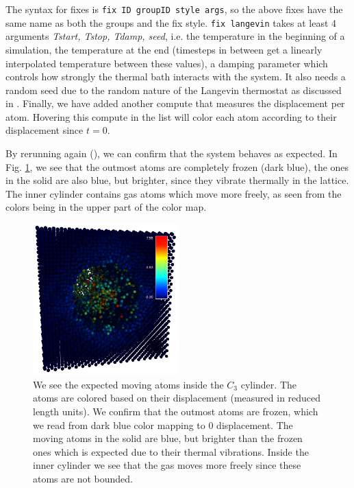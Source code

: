 \documentclass[aps,pre,twocolumn,letterpaper,floatfix,nofootinbib]{revtex4}
\newcommand{\code}[1]{\colorbox{light-gray}{\color{RawSienna}\texttt{#1}}}
\begin{document}
The syntax for fixes is \code{fix ID groupID style args}, so the above fixes have the same name as both the groups and the fix style.
\code{fix langevin} takes at least 4 arguments \textit{Tstart, Tstop, Tdamp, seed}, i.e. the temperature in the beginning of a simulation, the temperature at the end (timesteps in between get a linearly interpolated temperature between these values), a damping parameter which controls how strongly the thermal bath interacts with the system.
It also needs a random seed due to the random nature of the Langevin thermostat as discussed in \citep{schneider1978molecular}.
Finally, we have added another compute that measures the displacement per atom.
Hovering this compute in the list will color each atom according to their displacement since $t=0$.

By rerunning again (), we can confirm that the system behaves as expected.
In Fig. \ref{fig:moving_atoms}, we see that the outmost atoms are completely frozen (dark blue), the ones in the solid are also blue, but brighter, since they vibrate thermally in the lattice.
The inner cylinder contains gas atoms which move more freely, as seen from the colors being in the upper part of the color map.

\begin{figure}
	\centering
	\includegraphics[width=0.5\textwidth]{lj_flow/07_moving.png}
	\caption{
		We see the expected moving atoms inside the $C_3$ cylinder.
		The atoms are colored based on their displacement (measured in reduced length units).
		We confirm that the outmost atoms are frozen, which we read from dark blue color mapping to 0 displacement.
		The moving atoms in the solid are blue, but brighter than the frozen ones which is expected due to their thermal vibrations.
		Inside the inner cylinder we see that the gas moves more freely since these atoms are not bounded.
    }
	\label{fig:moving_atoms}
\end{figure}
\end{document}

